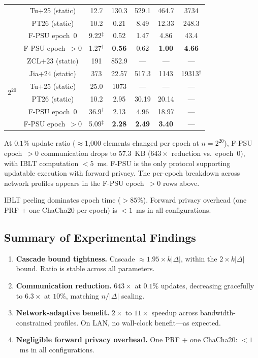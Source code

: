 \documentclass[letterpaper,twocolumn,10pt]{article}
\theoremstyle{definition}
\begin{document}
\begin{table}[t]
\begin{tabular}{lcccccc}
& Tu+25 (static)       & 12.7  & 130.3 & 529.1 & 464.7 & 3734 \\
& PT26 (static)        & 10.2  & 0.21  & 8.49  & 12.33 & 248.3 \\
& F-PSU epoch~0        & 9.22$^\ddagger$  & 0.52  & 1.47  & 4.86  & 43.4 \\
& F-PSU epoch~$>$0     & 1.27$^\ddagger$  & \textbf{0.56} & 0.62 & \textbf{1.00} & \textbf{4.66} \\
\midrule
\multirow{6}{*}{$2^{20}$}
& ZCL+23 (static)      & 191   & 852.9 & ---   & ---   & --- \\
& Jia+24 (static)      & 373   & 22.57 & 517.3 & 1143  & 19313$^\dagger$ \\
& Tu+25 (static)       & 25.0  & 1073  & ---   & ---   & --- \\
& PT26 (static)        & 10.2  & 2.95  & 30.19 & 20.14 & --- \\
& F-PSU epoch~0        & 36.9$^\ddagger$  & 2.13  & 4.96  & 18.97 & --- \\
& F-PSU epoch~$>$0     & 5.09$^\ddagger$  & \textbf{2.28} & \textbf{2.49} & \textbf{3.40} & --- \\
\bottomrule
\end{tabular}
\end{table}

\smallskip\noindent
At $0.1\%$ update ratio ($\approx$1,000 elements changed per epoch at
$n=2^{20}$), F-PSU epoch~$>$0 communication drops to $57.3$~KB
($643\times$ reduction vs.\ epoch~0), with IBLT computation $<5$~ms.
F-PSU is the only protocol supporting updatable execution with forward
privacy. The per-epoch breakdown across network profiles appears in the
F-PSU epoch~$>$0 rows above.

IBLT peeling dominates epoch time ($>85\%$). Forward privacy overhead
(one PRF + one ChaCha20 per epoch) is $<1$~ms in all configurations.



\subsection{Summary of Experimental Findings}

\begin{enumerate}
\item \textbf{Cascade bound tightness.} Cascade $\approx 1.95 \times
k|\Delta|$, within the $2 \times k|\Delta|$ bound. Ratio is stable across all
parameters.
\item \textbf{Communication reduction.} $643\times$ at $0.1\%$ updates,
decreasing gracefully to $6.3\times$ at $10\%$, matching $n/|\Delta|$ scaling.
\item \textbf{Network-adaptive benefit.} $2\times$ to $11\times$ speedup across
bandwidth-constrained profiles. On LAN, no wall-clock benefit---as expected.
\item \textbf{Negligible forward privacy overhead.} One PRF + one ChaCha20:
$<1$~ms in all configurations.
\end{enumerate}
\end{document}
